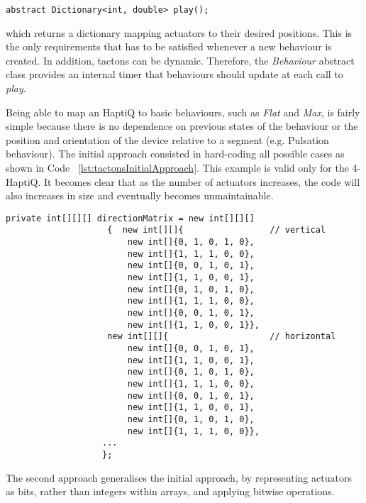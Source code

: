 \lstset{style=sharpc1}
\begin{lstlisting}
abstract Dictionary<int, double> play();
\end{lstlisting}

which returns a dictionary mapping actuators to their desired positions. 
This is the only requirements that has to be satisfied whenever a new behaviour is created. In addition, tactons can be dynamic. Therefore, the \textit{Behaviour} abstract class provides an internal timer that behaviours should update at each call to \textit{play}. 

Being able to map an HaptiQ to basic behaviours, such as \textit{Flat} and \textit{Max}, is fairly simple because there is no dependence on previous states of the behaviour or the position and orientation of the device relative to a segment (e.g. Pulsation behaviour). The initial approach consisted in hard-coding all possible cases as shown in Code ~\ref{lst:tactonsInitialApproach}. This example is valid only for the 4-HaptiQ. It becomes clear that as the number of actuators increases, the code will also increases in size and eventually becomes unmaintainable. 

\lstset{style=sharpc1}
\begin{lstlisting}[caption={Tactons - Initial approach},label={lst:tactonsInitialApproach}]
private int[][][] directionMatrix = new int[][][]
                    {  new int[][]{                 // vertical 
                        new int[]{0, 1, 0, 1, 0}, 
                        new int[]{1, 1, 1, 0, 0}, 
                        new int[]{0, 0, 1, 0, 1}, 
                        new int[]{1, 1, 0, 0, 1}, 
                        new int[]{0, 1, 0, 1, 0}, 
                        new int[]{1, 1, 1, 0, 0}, 
                        new int[]{0, 0, 1, 0, 1}, 
                        new int[]{1, 1, 0, 0, 1}}, 
                    new int[][]{                    // horizontal
                        new int[]{0, 0, 1, 0, 1},
                        new int[]{1, 1, 0, 0, 1},
                        new int[]{0, 1, 0, 1, 0},
                        new int[]{1, 1, 1, 0, 0},
                        new int[]{0, 0, 1, 0, 1},
                        new int[]{1, 1, 0, 0, 1},
                        new int[]{0, 1, 0, 1, 0},
                        new int[]{1, 1, 1, 0, 0}},
                   ...
                   };
\end{lstlisting}

The second approach generalises the initial approach, by representing actuators as bits, rather than integers within arrays, and applying bitwise operations. 

